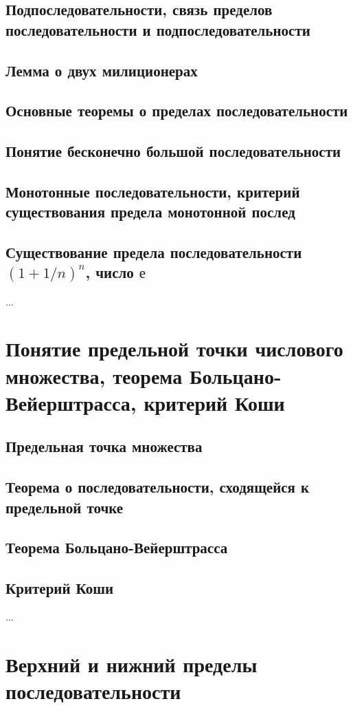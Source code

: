 \subsection{Подпоследовательности, связь пределов последовательности и подпоследовательности}
\subsection{Лемма о двух милиционерах}
\subsection{Основные теоремы о пределах последовательности}
\subsection{Понятие бесконечно большой последовательности}
\subsection{Монотонные последовательности, критерий существования предела монотонной послед}
\subsection{Существование предела последовательности $(1+1/n)^n$, число $е$ }
...

\section{Понятие предельной точки числового множества, теорема Больцано-Вейерштрасса, критерий Коши}
\subsection{Предельная точка множества}
\subsection{Теорема о последовательности, сходящейся к предельной точке}
\subsection{Теорема Больцано-Вейерштрасса}
\subsection{Критерий Коши}
...

\section{Верхний и нижний пределы последовательности}
